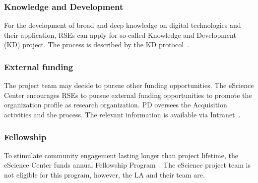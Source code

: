 \subsubsection{Knowledge and Development}
\label{sec:opportunities:kd}
For the development of broad and deep knowledge on digital technologies and their application, RSEs can apply for
so-called Knowledge and Development (KD) project. The process is described by the KD protocol~\cite{intranet}.

\subsubsection{External funding}
\label{sec:opportunities:external-funding}
The project team may decide to pursue other funding opportunities. The eScience Center encourages RSEs to pursue
external funding opportunities to promote the organization profile as research organization. PD oversees the
Acquisition activities and the process. The relevant information is available via Intranet~\cite{intranet}.


\subsubsection{Fellowship}
\label{sec:opportunities:fellowship}
To stimulate community engagement lasting longer than project lifetime, the eScience Center funds annual Fellowship
Program~\cite{fellowship,fellowship-call}. The eScience project team is not eligible for this program, however, the LA and their team are.

